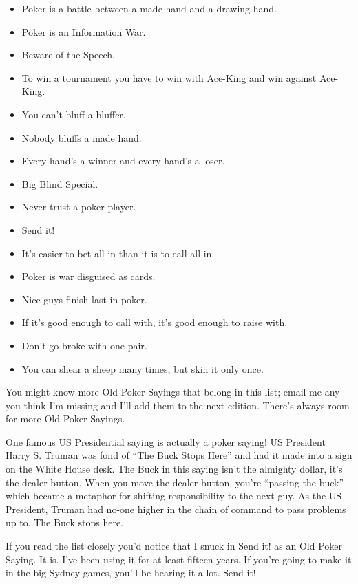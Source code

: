 \begin{itemize}
  \item Poker is a battle between a made hand and a drawing hand.
  \item Poker is an Information War.
  \item Beware of the Speech.
  \item To win a tournament you have to win with Ace-King and win
    against Ace-King.
  \item You can't bluff a bluffer.
  \item Nobody bluffs a made hand.
  \item Every hand's a winner and every hand's a loser.
  \item Big Blind Special.
  \item Never trust a poker player.
  \item Send it!
  \item It's easier to bet all-in than it is to call all-in.
  \item Poker is war disguised as cards.
  \item Nice guys finish last in poker.
  \item If it's good enough to call with, it's good enough to raise with.
  \item Don't go broke with one pair.
  \item You can shear a sheep many times, but skin it only once.
\end{itemize}

You might know more Old Poker Sayings that belong in this list;
email me any you think I'm missing and I'll add them to the next
edition. There's always room for more Old Poker Sayings.

One famous US Presidential saying is actually a poker saying!
US President Harry S. Truman was fond of ``The Buck Stops Here'' and
had it made into a sign on the White House desk. The Buck in
this saying isn't the almighty dollar, it's the dealer button. When
you move the dealer button, you're ``passing the buck'' which became a
metaphor for shifting responsibility to the next guy. As the US
President, Truman had no-one higher in the chain of command to pass
problems up to. The Buck stops here.

If you read the list closely you'd notice that I snuck in
Send it! as an Old Poker Saying. It is. I've been using it for at
least fifteen years. If you're going to make it in the big Sydney
games, you'll be hearing it a lot. Send it!
